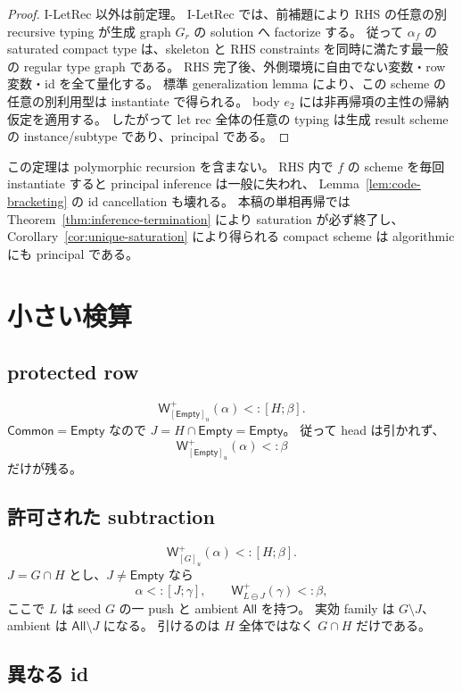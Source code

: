 \documentclass[uplatex,dvipdfmx,a4paper,10.5pt]{jsarticle}
\theoremstyle{jpplain}
\newcommand{\All}{\mathsf{All}}
\newcommand{\Empty}{\mathsf{Empty}}
\newcommand{\Common}{\mathsf{Common}}
\newcommand{\PWeight}[2]{\mathsf{W}^{+}_{#1}(#2)}
\newcommand{\takeop}[2]{[#1]_{#2}}
\newcommand{\row}[2]{[#1;#2]}
\begin{document}
\begin{proof}
I-LetRec 以外は前定理。
I-LetRec では、前補題により RHS の任意の別 recursive typing が生成 graph $G_r$ の solution へ factorize する。
従って $\alpha_f$ の saturated compact type は、skeleton と RHS constraints を同時に満たす最一般の regular type graph である。
RHS 完了後、外側環境に自由でない変数・row 変数・id を全て量化する。
標準 generalization lemma により、この scheme の任意の別利用型は instantiate で得られる。
body $e_2$ には非再帰項の主性の帰納仮定を適用する。
したがって let rec 全体の任意の typing は生成 result scheme の instance/subtype であり、principal である。
\end{proof}

\begin{notebox}
この定理は polymorphic recursion を含まない。
RHS 内で $f$ の scheme を毎回 instantiate すると principal inference は一般に失われ、
Lemma~\ref{lem:code-bracketing} の id cancellation も壊れる。
本稿の単相再帰では Theorem~\ref{thm:inference-termination} により saturation が必ず終了し、
Corollary~\ref{cor:unique-saturation} により得られる compact scheme は algorithmic にも principal である。
\end{notebox}

\section{小さい検算}

\subsection{protected row}

\[
  \PWeight{\takeop{\Empty}{u}}{\alpha}<:\row{H}{\beta}.
\]
$\Common=\Empty$ なので $J=H\cap\Empty=\Empty$。
従って head は引かれず、
\[
  \PWeight{\takeop{\Empty}{u}}{\alpha}<:\beta
\]
だけが残る。

\subsection{許可された subtraction}

\[
  \PWeight{\takeop{G}{u}}{\alpha}<:\row{H}{\beta}.
\]
$J=G\cap H$ とし、$J\neq\Empty$ なら
\[
  \alpha<:\row{J}{\gamma},
  \qquad
  \PWeight{L\ominus J}{\gamma}<:\beta,
\]
ここで $L$ は seed $G$ の一 push と ambient $\All$ を持つ。
実効 family は $G\setminus J$、ambient は $\All\setminus J$ になる。
引けるのは $H$ 全体ではなく $G\cap H$ だけである。

\subsection{異なる id}
\end{document}
